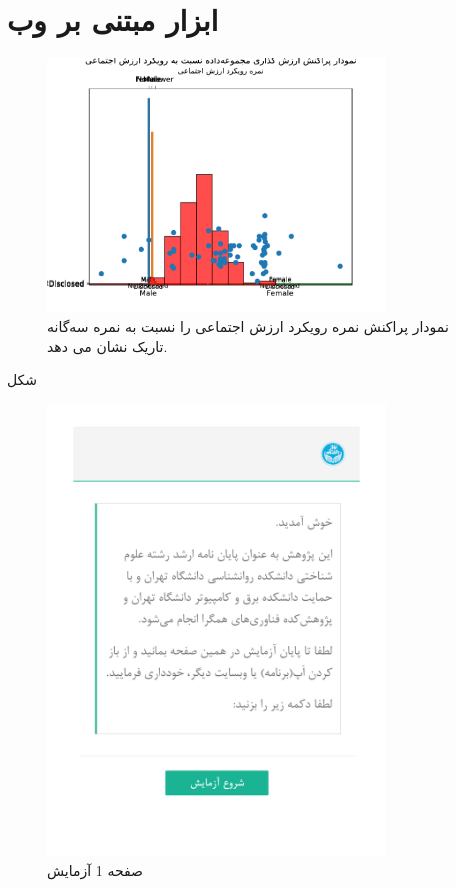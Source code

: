 \chapter{ابزار مبتنی بر وب}
\begin{figure}[htpb]
    \centering
    \includegraphics[width=0.8\textwidth]{./img/ScatterSVOScoreDarkTriadScore.pdf}
    \caption{نمودار پراکنش نمره رویکرد ارزش اجتماعی را نسبت به نمره سه‌گانه تاریک نشان می دهد. }
    \label{fig:ScatterSVOScoreDarkTriadScore}
\end{figure}
شکل 
\label{fig:sexualityAndSVOAgainstPopulation}



\begin{figure}[htpb]
\centering
\includegraphics[width=0.8\textwidth,height=0.8\textheight,keepaspectratio]{./img/Task1.png}
\caption{ صفحه 1 آزمایش }
\label{fig:Task1}
\end{figure}
 
